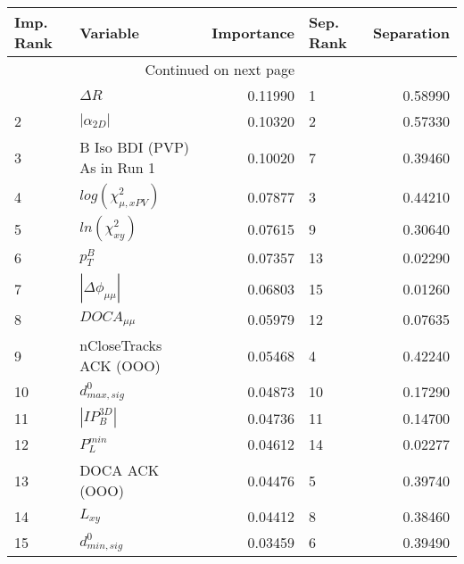 \usepackage{lscape}

\begin{landscape}
\begin{longtable}{llrlr}
\toprule
Imp. Rank &                     Variable &  Importance & Sep. Rank &  Separation \\
\midrule
\endhead
\midrule
\multicolumn{3}{r}{{Continued on next page}} \\
\midrule
\endfoot

\bottomrule
\endlastfoot
        1 &                   $\Delta R$ &     0.11990 &         1 &     0.58990 \\
        2 &              $|\alpha_{2D}|$ &     0.10320 &         2 &     0.57330 \\
        3 &  B Iso BDI (PVP) As in Run 1 &     0.10020 &         7 &     0.39460 \\
        4 &    $log(\chi^{2}_{\mu,xPV})$ &     0.07877 &         3 &     0.44210 \\
        5 &          $ln(\chi^{2}_{xy})$ &     0.07615 &         9 &     0.30640 \\
        6 &                    $p^B_{T}$ &     0.07357 &        13 &     0.02290 \\
        7 &     $|\Delta \phi_{\mu\mu}|$ &     0.06803 &        15 &     0.01260 \\
        8 &              $DOCA_{\mu\mu}$ &     0.05979 &        12 &     0.07635 \\
        9 &       nCloseTracks ACK (OOO) &     0.05468 &         4 &     0.42240 \\
       10 &             $d^0_{max, sig}$ &     0.04873 &        10 &     0.17290 \\
       11 &              $|IP_{B}^{3D}|$ &     0.04736 &        11 &     0.14700 \\
       12 &                $P^{min}_{L}$ &     0.04612 &        14 &     0.02277 \\
       13 &               DOCA ACK (OOO) &     0.04476 &         5 &     0.39740 \\
       14 &                     $L_{xy}$ &     0.04412 &         8 &     0.38460 \\
       15 &             $d^0_{min, sig}$ &     0.03459 &         6 &     0.39490 \\
\end{longtable}

\end{landscape}
